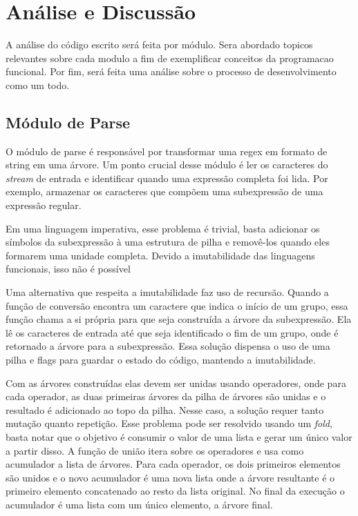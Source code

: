 \section{Análise e Discussão}

A análise do código escrito será feita por módulo.
Sera abordado topicos relevantes sobre cada modulo a fim de exemplificar conceitos da programacao funcional.
Por fim, será feita uma análise sobre o processo de desenvolvimento como um todo.

\subsection{Módulo de Parse}

O módulo de parse é responsável por transformar uma regex em formato de string em uma árvore.
Um ponto crucial desse módulo é ler os caracteres do \emph{stream} de entrada e identificar quando uma expressão completa foi lida.
Por exemplo, armazenar os caracteres que compõem uma subexpressão de uma expressão regular.

Em uma linguagem imperativa, esse problema é trivial, basta adicionar os símbolos da subexpressão à uma estrutura de pilha e removê-los quando eles formarem uma unidade completa.
Devido a imutabilidade das linguagens funcionais, isso não é possível

Uma alternativa que respeita a imutabilidade faz uso de recursão.
Quando a função de conversão encontra um caractere que indica o início de um grupo, essa função chama a si própria para que seja construída a árvore da subexpressão.
Ela lê os caracteres de entrada até que seja identificado o fim de um grupo, onde é retornado a árvore para a subexpressão.
Essa solução dispensa o uso de uma pilha e flags para guardar o estado do código, mantendo a imutabilidade.

Com as árvores construídas elas devem ser unidas usando operadores, onde para cada operador, as duas primeiras árvores da pilha de árvores são unidas e o resultado é adicionado ao topo da pilha.
Nesse caso, a solução requer tanto mutação quanto repetição.
Esse problema pode ser resolvido usando um \emph{fold}, basta notar que o objetivo é consumir o valor de uma lista e gerar um único valor a partir disso.
A função de união itera sobre os operadores e usa como acumulador a lista de árvores.
Para cada operador, os dois primeiros elementos são unidos e o novo acumulador é uma nova lista onde a árvore resultante é o primeiro elemento concatenado ao resto da lista original.
No final da execução o acumulador é uma lista com um único elemento, a árvore final.

